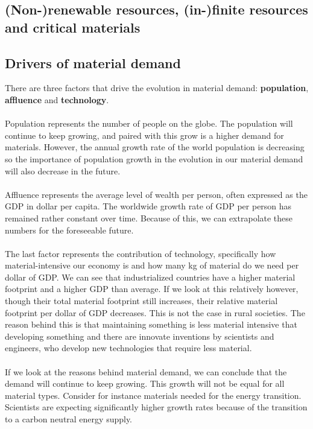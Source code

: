 \documentclass[../summary.tex]{subfiles}
\begin{document}
	\subsection{(Non-)renewable resources, (in-)finite resources and critical materials}
	
	
	
	\subsection{Drivers of material demand}
	
	There are three factors that drive the evolution in material demand: \textbf{population}, \textbf{affluence} and \textbf{technology}. 
	\\\\
	Population represents the number of people on the globe. The population will continue to keep growing, and paired with this grow is a higher demand for materials. However, the annual growth rate of the world population is decreasing so the importance of population growth in the evolution in our material demand will also decrease in the future.
	\\\\
	Affluence represents the average level of wealth per person, often expressed as the GDP in dollar per capita. The worldwide growth rate of GDP per person has remained rather constant over time. Because of this, we can extrapolate these numbers for the foreseeable future.
	\\\\
	The last factor represents the contribution of technology, specifically how material-intensive our economy is and how many kg of material do we need per dollar of GDP. We can see that industrialized countries have a higher material footprint and a higher GDP than average. If we look at this relatively however, though their total material footprint still increases, their relative material footprint per dollar of GDP decreases. This is not the case in rural societies. The reason behind this is that maintaining something is less material intensive that developing something and there are innovate inventions by scientists and engineers, who develop new technologies that require less material. 
	\\\\
	If we look at the reasons behind material demand, we can conclude that the demand will continue to keep growing. This growth will not be equal for all material types. Consider for instance materials needed for the energy transition. Scientists are expecting significantly higher growth rates because of the transition to a carbon neutral energy supply.
	
\end{document}
